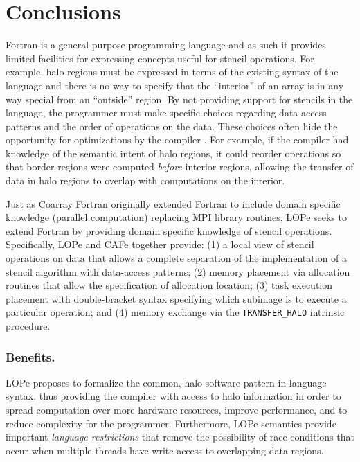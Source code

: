 \section{Conclusions}

Fortran is a general-purpose programming language and as such it provides limited facilities for
expressing concepts useful for stencil operations. For example, halo regions must be expressed in
terms of the existing syntax of the language and there is no way to specify that the ``interior''
of an array is in any way special from an ``outside'' region.  By not providing support for
stencils in the language, the programmer must make specific choices regarding data-access patterns
and the order of operations on the data.  These choices often hide the opportunity for
optimizations by the compiler \cite{Dubey:2014:SSC:2686745.2686756}.  For example, if the compiler
had knowledge of the semantic intent of halo regions, it could reorder operations so that border
regions were computed \emph{before} interior regions, allowing the transfer of data in halo regions
to overlap with computations on the interior.

Just as Coarray Fortran originally extended Fortran to include domain specific knowledge (parallel
computation) replacing MPI library routines\cite{Numrich:1998:CFP:289918.289920}, LOPe seeks to extend Fortran by
providing domain specific knowledge of stencil operations.
Specifically, LOPe and CAFe together provide:
(1) a local view of stencil operations on data that allows a complete separation of the implementation of a stencil
algorithm with data-access patterns;
(2) memory placement via allocation routines that allow the specification of allocation location;
(3) task execution placement with double-bracket syntax specifying which subimage is to execute a particular operation; and
(4) memory exchange via the \texttt{TRANSFER\_HALO} intrinsic procedure.

%
%


\subsubsection{Benefits.}
LOPe proposes to formalize the common, halo software pattern in language syntax, thus providing the
compiler with access to halo information in order to spread computation over more hardware
resources, improve performance, and to reduce complexity for the programmer.  Furthermore, LOPe
semantics provide important \emph{language restrictions} that remove the possibility of race conditions
that occur when multiple threads have write access to overlapping data regions.

